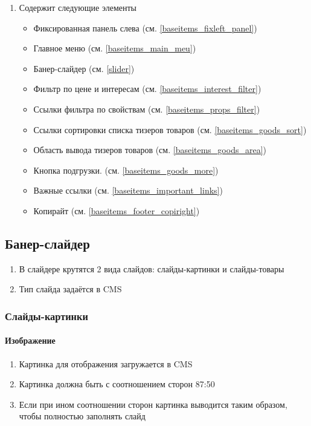         \begin{enumerate}
            \item
            Содержит следующие элементы
            \begin{itemize}
                \item Фиксированная панель слева (см. \ref{baseitems_fixleft_panel})
                \item Главное меню (см. \ref{baseitems_main_meu})
                \item Банер-слайдер (см. \ref{slider})
                \item Фильтр по цене и интересам (см. \ref{baseitems_interest_filter})
                \item Ссылки фильтра по свойствам (см. \ref{baseitems_props_filter})
                \item Ссылки сортировки списка тизеров товаров (см. \ref{baseitems_goods_sort})
                \item Область вывода тизеров товаров (см. \ref{baseitems_goods_area})
                \item Кнопка подгрузки.  (см. \ref{baseitems_goods_more})
                \item Важные ссылки (см. \ref{baseitems_important_links})
                \item Копирайт (см. \ref{baseitems_footer_copiright})
            \end{itemize}
        \end{enumerate}
    
        \subsection{Банер-слайдер}
            \label{sec:slider}
            
            \begin{enumerate}
                \item В слайдере крутятся 2 вида слайдов: слайды-картинки и слайды-товары
                \item Тип слайда задаётся в CMS
            \end{enumerate}
            
            \subsubsection{Слайды-картинки}
                \paragraph{Изображение}
                    \begin{enumerate}
                        \item Картинка для отображения загружается в CMS
                        \item Картинка должна быть с соотношением сторон 87:50
                        \item Если при ином соотношении сторон картинка выводится таким образом, чтобы полностью заполнять слайд
                    \end{enumerate}
                
